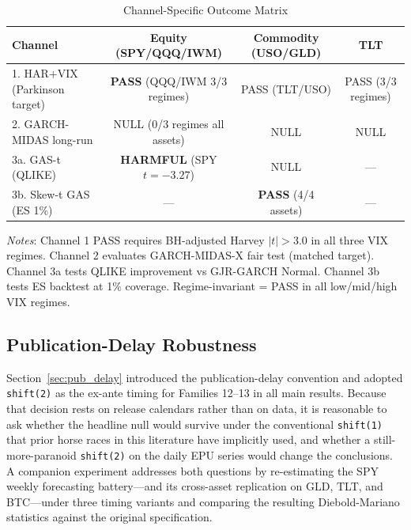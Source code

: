 \documentclass[12pt,a4paper]{article}
\begin{document}
\begin{table}[H]
\centering
\small
\begin{threeparttable}
\caption{Channel-Specific Outcome Matrix}
\label{tab:channel_outcomes}
\begin{tabular}{@{}lccc@{}}
\toprule
Channel & Equity (SPY/QQQ/IWM) & Commodity (USO/GLD) & TLT \\
\midrule
1. HAR+VIX (Parkinson target) & \textbf{PASS} (QQQ/IWM 3/3 regimes) & PASS (TLT/USO) & PASS (3/3 regimes) \\
2. GARCH-MIDAS long-run & NULL (0/3 regimes all assets) & NULL & NULL \\
3a. GAS-t (QLIKE) & \textbf{HARMFUL} (SPY $t=-3.27$) & NULL & --- \\
3b. Skew-t GAS (ES 1\%) & --- & \textbf{PASS} (4/4 assets) & --- \\
\bottomrule
\end{tabular}
\begin{tablenotes}
\small
\item \textit{Notes}: Channel 1 PASS requires BH-adjusted Harvey $|t|>3.0$ in all three VIX regimes. Channel 2 evaluates GARCH-MIDAS-X fair test (matched target). Channel 3a tests QLIKE improvement vs GJR-GARCH Normal. Channel 3b tests ES backtest at 1\% coverage. Regime-invariant = PASS in all low/mid/high VIX regimes.
\end{tablenotes}
\end{threeparttable}
\end{table}


\subsection{Publication-Delay Robustness}
\label{subsec:pub_delay_robust}


Section~\ref{sec:pub_delay} introduced the publication-delay convention and adopted \texttt{shift(2)} as the ex-ante timing for Families 12--13 in all main results. Because that decision rests on release calendars rather than on data, it is reasonable to ask whether the headline null would survive under the conventional \texttt{shift(1)} that prior horse races in this literature have implicitly used, and whether a still-more-paranoid \texttt{shift(2)} on the daily EPU series would change the conclusions. A companion experiment addresses both questions by re-estimating the SPY weekly forecasting battery---and its cross-asset replication on GLD, TLT, and BTC---under three timing variants and comparing the resulting Diebold-Mariano statistics against the original specification.
\end{document}
